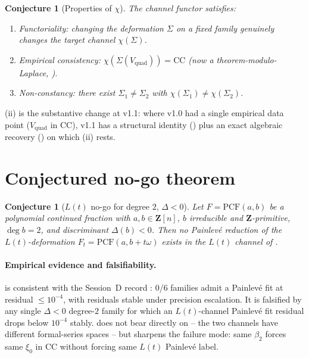 \documentclass[11pt,reqno]{amsart}
\theoremstyle{plain}
\newtheorem{conjecture}[theorem]{Conjecture}
\theoremstyle{definition}
\theoremstyle{remark}
\newcommand{\PCF}{\mathrm{PCF}}
\newcommand{\Lt}{L(t)}
\newcommand{\CC}{\mathrm{CC}}
\newcommand{\Vquad}{V_{\mathrm{quad}}}
\begin{document}
\begin{conjecture}[Properties of $\chi$]
\label{conj:chi}
The channel functor satisfies:
\begin{enumerate}[label=(\roman*)]
\item Functoriality: changing the deformation $\Sigma$ on a
fixed family genuinely changes the target channel $\chi(\Sigma)$.
\item Empirical consistency:
$\chi(\Sigma(\Vquad)) = \CC$ (now a theorem-modulo-Laplace,
).
\item Non-constancy: there exist $\Sigma_1 \neq \Sigma_2$
with $\chi(\Sigma_1) \ne \chi(\Sigma_2)$.
\end{enumerate}
\end{conjecture}

(ii) is the substantive change at v1.1: where
v1.0 had a single empirical data point ($\Vquad$ in $\CC$),
v1.1 has a structural identity () plus an
exact algebraic recovery () on which
(ii) rests.

\section{Conjectured no-go theorem}
\label{sec:nogo}

\begin{conjecture}[$\Lt$ no-go for degree $2$, $\Delta<0$]
\label{conj:nogo}
Let $F = \PCF(a, b)$ be a polynomial continued fraction with
$a, b \in \mathbf{Z}[n]$, $b$ irreducible and
$\mathbf{Z}$-primitive, $\deg b = 2$, and discriminant
$\Delta(b) < 0$. Then no Painlev\'e reduction of the
$\Lt$-deformation $F_t = \PCF(a, b + t\omega)$ exists in the
$\Lt$ channel of .
\end{conjecture}

\paragraph{Empirical evidence and falsifiability.}
 is consistent with the Session~D record
\cite{siarc_painleve_deep_6x}: 0/6 families admit a Painlev\'e
fit at residual $\le 10^{-4}$, with residuals stable under
precision escalation. It is falsified by any single
$\Delta < 0$ degree-$2$ family for which an $\Lt$-channel
Painlev\'e fit residual drops below $10^{-4}$ stably.
 does not bear directly on  --
the two channels have different formal-series spaces -- but
 sharpens the failure mode: same $\beta_2$
forces same $\xi_0$ in $\CC$ without forcing same $\Lt$
Painlev\'e label.
\end{document}
